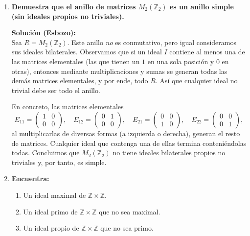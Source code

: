 \documentclass[12pt]{article}
\theoremstyle{definition}
\theoremstyle{remark}
\begin{document}
\begin{enumerate}[label=\textbf{\arabic*.}]
\item \textbf{Demuestra que el anillo de matrices $M_2(\mathbb{Z}_2)$ es un anillo simple (sin ideales propios no triviales).}

\textbf{Solución (Esbozo):}\\
Sea $R = M_2(\mathbb{Z}_2)$. Este anillo \textit{no} es conmutativo, pero igual consideramos sus ideales bilaterales. Observamos que si un ideal $I$ contiene al menos una de las matrices elementales (las que tienen un $1$ en una sola posición y $0$ en otras), entonces mediante multiplicaciones y sumas se generan todas las demás matrices elementales, y por ende, todo $R$. Así que cualquier ideal no trivial debe ser todo el anillo.

\smallskip

En concreto, las matrices elementales 
\[
E_{11} = \begin{pmatrix} 1 & 0 \\ 0 & 0 \end{pmatrix},\quad
E_{12} = \begin{pmatrix} 0 & 1 \\ 0 & 0 \end{pmatrix},\quad
E_{21} = \begin{pmatrix} 0 & 0 \\ 1 & 0 \end{pmatrix},\quad
E_{22} = \begin{pmatrix} 0 & 0 \\ 0 & 1 \end{pmatrix},
\]
al multiplicarlas de diversas formas (a izquierda o derecha), generan el resto de matrices. Cualquier ideal que contenga una de ellas termina conteniéndolas todas. Concluimos que $M_2(\mathbb{Z}_2)$ no tiene ideales bilaterales propios no triviales y, por tanto, es simple.


\item \textbf{Encuentra:}
\begin{enumerate}[label=\alph*)]
\item Un ideal maximal de $\mathbb{Z} \times \mathbb{Z}$. 
\item Un ideal primo de $\mathbb{Z} \times \mathbb{Z}$ que no sea maximal. 
\item Un ideal propio de $\mathbb{Z} \times \mathbb{Z}$ que no sea primo.
\end{enumerate}


\end{enumerate}
\end{document}
